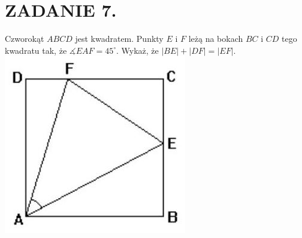 \documentclass[10pt]{article}
\begin{document}
\section*{ZADANIE 7.}
Czworokąt \(A B C D\) jest kwadratem. Punkty \(E\) i \(F\) leżą na bokach \(B C\) i \(C D\) tego kwadratu tak, że \(\measuredangle E A F=45^{\circ}\). Wykaż, że \(|B E|+|D F|=|E F|\).\\
\includegraphics[max width=\textwidth, center]{2024_11_21_cdfba54282833f1a9b44g-1}
\end{document}
